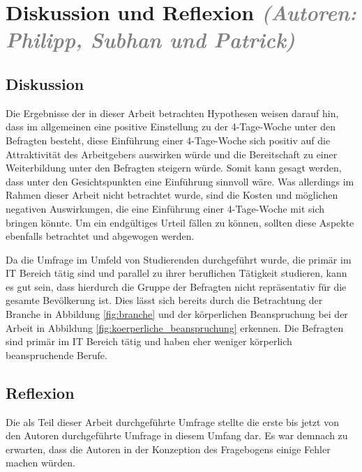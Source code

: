 \chapter{Diskussion und Reflexion \textit{\textcolor{gray}{(Autoren: Philipp, Subhan und Patrick)}}}


\section{Diskussion}
Die Ergebnisse der in dieser Arbeit betrachten Hypothesen weisen darauf hin, dass im allgemeinen eine 
positive Einstellung zu der 4-Tage-Woche unter den Befragten besteht, diese Einführung einer 4-Tage-Woche
sich positiv auf die Attraktivität des Arbeitgebers auswirken würde und die Bereitschaft zu einer Weiterbildung
unter den Befragten steigern würde.
Somit kann gesagt werden, dass unter den Gesichtspunkten eine Einführung sinnvoll wäre.
Was allerdings im Rahmen dieser Arbeit nicht betrachtet wurde, sind die Kosten und möglichen negativen Auswirkungen, 
die eine Einführung einer 4-Tage-Woche mit sich bringen könnte. Um ein endgültiges Urteil fällen zu können,
sollten diese Aspekte ebenfalls betrachtet und abgewogen werden.

Da die Umfrage im Umfeld von Studierenden durchgeführt wurde, die primär im IT Bereich tätig sind und parallel
zu ihrer beruflichen Tätigkeit studieren, kann es gut sein, dass hierdurch die Gruppe der Befragten nicht
repräsentativ für die gesamte Bevölkerung ist. 
Dies lässt sich bereits durch die Betrachtung der Branche in Abbildung \ref{fig:branche} und der 
körperlichen Beanspruchung bei der Arbeit in Abbildung \ref{fig:koerperliche_beanspruchung} erkennen.
Die Befragten sind primär im IT Bereich tätig und haben eher weniger körperlich beanspruchende Berufe.


\section{Reflexion}
Die als Teil dieser Arbeit durchgeführte Umfrage stellte die erste bis jetzt von den Autoren durchgeführte
Umfrage in diesem Umfang dar. Es war demnach zu erwarten, dass die Autoren in der Konzeption des Fragebogens
einige Fehler machen würden. 

